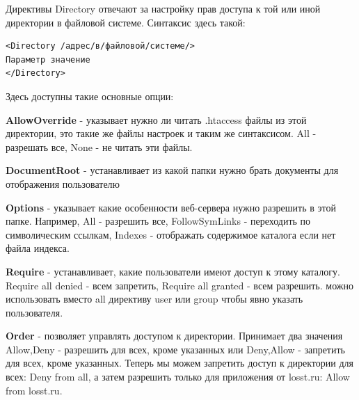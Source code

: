 \documentclass[14pt, a4paper]{article}
\begin{document}
\begin{figure}[h]%
    \centering
    \label{1.5}
\end{figure}

Директивы Directory отвечают за настройку прав доступа к той или иной 
директории в файловой системе. Синтаксис здесь такой:

\begin{lstlisting}
<Directory /адрес/в/файловой/системе/>
Параметр значение
</Directory>
\end{lstlisting}

Здесь доступны такие основные опции:

\textbf{AllowOverride} - указывает нужно ли читать .htaccess файлы из этой директории, это такие 
же файлы настроек и таким же синтаксисом. All - разрешать все, None - не читать эти файлы.

\textbf{DocumentRoot} - устанавливает из какой папки нужно брать документы для отображения пользователю

\textbf{Options} - указывает какие особенности веб-сервера нужно разрешить в этой папке. Например, 
All - разрешить все, FollowSymLinks - переходить по символическим ссылкам, Indexes - отображать 
содержимое каталога если нет файла индекса.

\textbf{Require} - устанавливает, какие пользователи имеют доступ к этому каталогу. Require all 
denied - всем запретить, Require all granted - всем разрешить. можно использовать вместо 
all директиву user или group чтобы явно указать пользователя.

\textbf{Order} - позволяет управлять доступом к директории. Принимает два значения Allow,Deny - 
разрешить для всех, кроме указанных или Deny,Allow - запретить для всех, кроме указанных. 
Теперь мы можем запретить доступ к директории для всех: Deny from all, а затем разрешить 
только для приложения от losst.ru: Allow from losst.ru.
\end{document}
